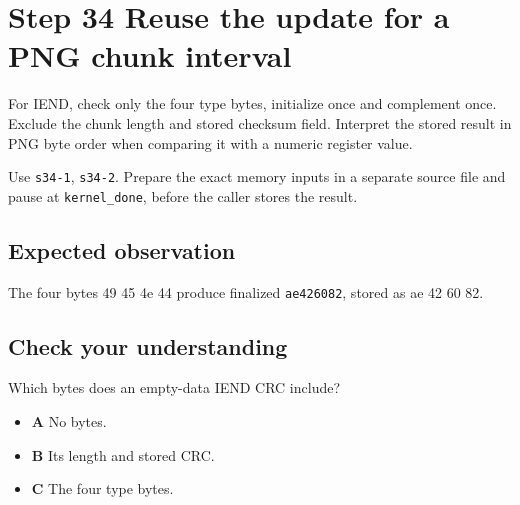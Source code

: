 \section{Step 34 Reuse the update for a PNG chunk interval}\label{crc-s34}

For IEND, check only the four type bytes, initialize once and complement once. Exclude the chunk length and stored checksum field. Interpret the stored result in PNG byte order when comparing it with a numeric register value.

Use \texttt{s34-1}, \texttt{s34-2}. Prepare the exact memory inputs in a separate source file and pause at \texttt{kernel\_done}, before the caller stores the result.

\subsection{Expected observation}
The four bytes 49 45 4e 44 produce finalized \texttt{ae426082}, stored as ae 42 60 82.

\subsection{Check your understanding}
Which bytes does an empty-data IEND CRC include?

\begin{itemize}
  \item \textbf{A} No bytes.
  \item \textbf{B} Its length and stored CRC.
  \item \textbf{C} The four type bytes.
\end{itemize}
